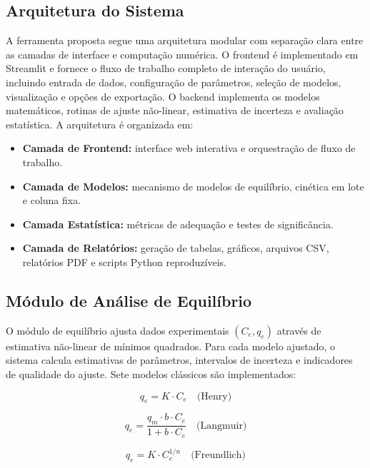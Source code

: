 \documentclass[openany, a4paper, twoside]{article}
\begin{document}
\subsection{Arquitetura do Sistema}

A ferramenta proposta segue uma arquitetura modular com separação clara entre as camadas de interface e computação numérica. O frontend é implementado em Streamlit e fornece o fluxo de trabalho completo de interação do usuário, incluindo entrada de dados, configuração de parâmetros, seleção de modelos, visualização e opções de exportação. O backend implementa os modelos matemáticos, rotinas de ajuste não-linear, estimativa de incerteza e avaliação estatística. A arquitetura é organizada em:

\begin{itemize}
	\item \textbf{Camada de Frontend:} interface web interativa e orquestração de fluxo de trabalho.
	\item \textbf{Camada de Modelos:} mecanismo de modelos de equilíbrio, cinética em lote e coluna fixa.
	\item \textbf{Camada Estatística:} métricas de adequação e testes de significância.
	\item \textbf{Camada de Relatórios:} geração de tabelas, gráficos, arquivos CSV, relatórios PDF e scripts Python reproduzíveis.
\end{itemize}

\subsection{Módulo de Análise de Equilíbrio}

O módulo de equilíbrio ajusta dados experimentais $(C_e, q_e)$ através de estimativa não-linear de mínimos quadrados. Para cada modelo ajustado, o sistema calcula estimativas de parâmetros, intervalos de incerteza e indicadores de qualidade do ajuste. Sete modelos clássicos são implementados:

\begin{equation}
q_e = K \cdot C_e \quad \text{(Henry)}
\label{eq:henry}
\end{equation}

\begin{equation}
q_e = \frac{q_m \cdot b \cdot C_e}{1 + b \cdot C_e} \quad \text{(Langmuir)}
\label{eq:langmuir}
\end{equation}

\begin{equation}
q_e = K \cdot C_e^{1/n} \quad \text{(Freundlich)}
\label{eq:freundlich}
\end{equation}
\end{document}
